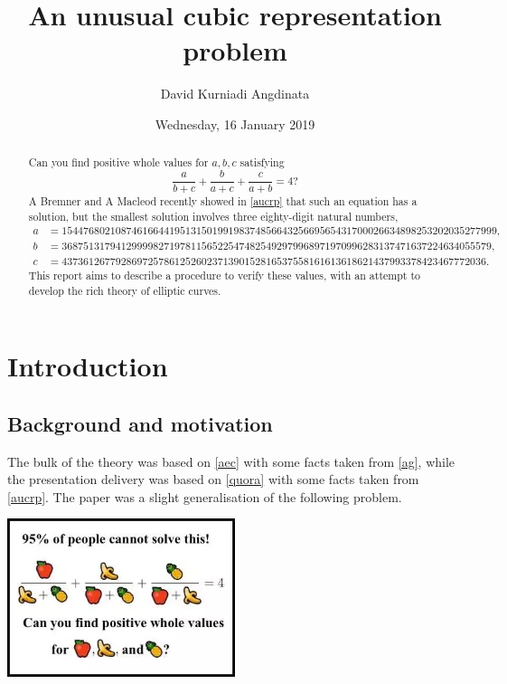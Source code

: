 \documentclass{article}
\title{An unusual cubic representation problem}
\author{David Kurniadi Angdinata}
\date{Wednesday, 16 January 2019}
\begin{document}
\maketitle

\begin{abstract}
Can you find positive whole values for $ a, b, c $ satisfying
$$ \dfrac{a}{b + c} + \dfrac{b}{a + c} + \dfrac{c}{a + b} = 4? $$
A Bremner and A Macleod recently showed in \ref{aucrp} that such an equation has a solution, but the smallest solution involves three eighty-digit natural numbers,
\begin{align*}
a & = 154476802108746166441951315019919837485664325669565431700026634898253202035277999, \\
b & = 36875131794129999827197811565225474825492979968971970996283137471637224634055579, \\
c & = 4373612677928697257861252602371390152816537558161613618621437993378423467772036.
\end{align*}
This report aims to describe a procedure to verify these values, with an attempt to develop the rich theory of elliptic curves.
\end{abstract}

\section{Introduction}

\subsection{Background and motivation}

The bulk of the theory was based on \ref{aec} with some facts taken from \ref{ag}, while the presentation delivery was based on \ref{quora} with some facts taken from \ref{aucrp}. The paper was a slight generalisation of the following problem.

\begin{center}
\includegraphics[width=0.5\textwidth]{img/positive_whole_values.png}
\end{center}
\end{document}
